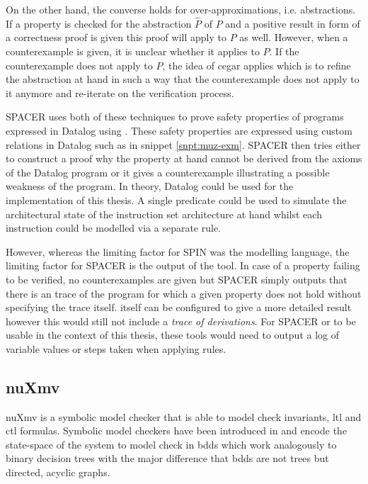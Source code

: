 On the other hand, the converse holds for over-approximations, i.e. abstractions.
If a property is checked for the abstraction $ \hat{P} $ of $ P $ and a positive result in form of a correctness proof is given this proof will apply to $ P $ as well.
However, when a counterexample is given, it is unclear whether it applies to $ P $.
If the counterexample does not apply to $ P $, the idea of \gls{cegar} \cite{Clark00} applies which is to refine the abstraction at hand in such a way that the counterexample does not apply to it anymore and re-iterate on the verification process.

SPACER uses both of these techniques to prove safety properties of programs expressed in Datalog using \muZ{}.
These safety properties are expressed using custom relations in Datalog such as  in snippet \ref{snpt:muz-exm}.
SPACER then tries either to construct a proof why the property at hand cannot be derived from the axioms of the Datalog program or it gives a counterexample illustrating a possible weakness of the program.
In theory, Datalog could be used for the implementation of this thesis.
A single predicate could be used to simulate the architectural state of the instruction set architecture at hand whilst each instruction could be modelled via a separate rule.

However, whereas the limiting factor for SPIN was the modelling language, the limiting factor for SPACER is the output of the tool.
In case of a property failing to be verified, no counterexamples are given but SPACER simply outputs that there is an trace of the program for which a given property does not hold without specifying the trace itself.
\muZ{} itself can be configured to give a more detailed result however this would still not include a \textit{trace of derivations}.
For SPACER or \muZ{} to be usable in the context of this thesis, these tools would need to output a log of variable values or steps taken when applying rules.

\subsection{nuXmv}
\label{sec:nuxmv}

nuXmv \cite{Cavada14} is a symbolic model checker that is able to model check invariants, \gls{ltl} and \gls{ctl} formulas.
Symbolic model checkers have been introduced in \cite{Burch92} and encode the state-space of the system to model check in \glspl{bdd} which work analogously to binary decision trees with the major difference that \glspl{bdd} are not trees but directed, acyclic graphs.


